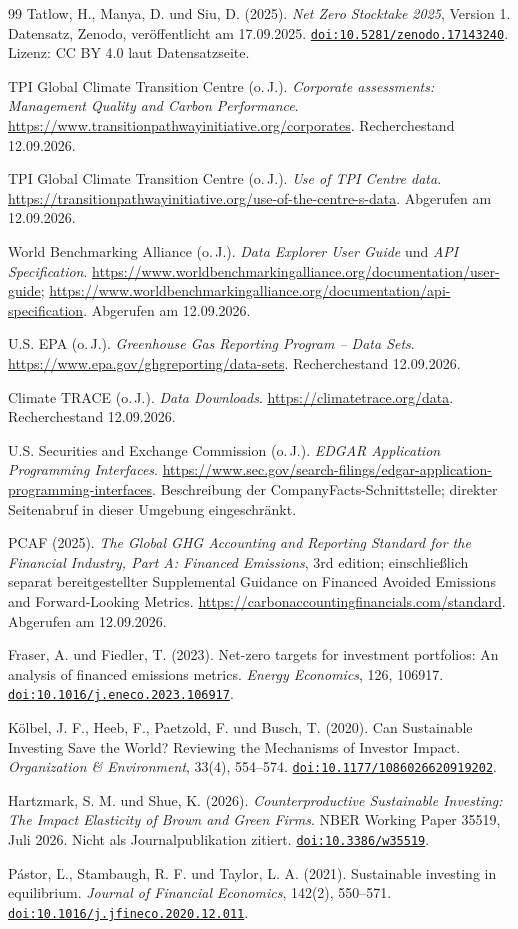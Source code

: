 \documentclass[11pt,a4paper]{article}
\newcommand{\doi}[1]{\href{https://doi.org/#1}{\nolinkurl{doi:#1}}}
\begin{document}
\begin{thebibliography}{99}
 Tatlow, H., Manya, D. und Siu, D. (2025). \emph{Net Zero Stocktake 2025}, Version 1. Datensatz, Zenodo, veröffentlicht am 17.09.2025. \doi{10.5281/zenodo.17143240}. Lizenz: CC BY 4.0 laut Datensatzseite.

 TPI Global Climate Transition Centre (o.\,J.). \emph{Corporate assessments: Management Quality and Carbon Performance}. \url{https://www.transitionpathwayinitiative.org/corporates}. Recherchestand 12.09.2026.

 TPI Global Climate Transition Centre (o.\,J.). \emph{Use of TPI Centre data}. \url{https://transitionpathwayinitiative.org/use-of-the-centre-s-data}. Abgerufen am 12.09.2026.

 World Benchmarking Alliance (o.\,J.). \emph{Data Explorer User Guide} und \emph{API Specification}. \url{https://www.worldbenchmarkingalliance.org/documentation/user-guide}; \url{https://www.worldbenchmarkingalliance.org/documentation/api-specification}. Abgerufen am 12.09.2026.

 U.S. EPA (o.\,J.). \emph{Greenhouse Gas Reporting Program -- Data Sets}. \url{https://www.epa.gov/ghgreporting/data-sets}. Recherchestand 12.09.2026.

 Climate TRACE (o.\,J.). \emph{Data Downloads}. \url{https://climatetrace.org/data}. Recherchestand 12.09.2026.

 U.S. Securities and Exchange Commission (o.\,J.). \emph{EDGAR Application Programming Interfaces}. \url{https://www.sec.gov/search-filings/edgar-application-programming-interfaces}. Beschreibung der CompanyFacts-Schnittstelle; direkter Seitenabruf in dieser Umgebung eingeschränkt.

 PCAF (2025). \emph{The Global GHG Accounting and Reporting Standard for the Financial Industry, Part A: Financed Emissions}, 3rd edition; einschließlich separat bereitgestellter Supplemental Guidance on Financed Avoided Emissions and Forward-Looking Metrics. \url{https://carbonaccountingfinancials.com/standard}. Abgerufen am 12.09.2026.

 Fraser, A. und Fiedler, T. (2023). Net-zero targets for investment portfolios: An analysis of financed emissions metrics. \emph{Energy Economics}, 126, 106917. \doi{10.1016/j.eneco.2023.106917}.

 Kölbel, J. F., Heeb, F., Paetzold, F. und Busch, T. (2020). Can Sustainable Investing Save the World? Reviewing the Mechanisms of Investor Impact. \emph{Organization \& Environment}, 33(4), 554--574. \doi{10.1177/1086026620919202}.

 Hartzmark, S. M. und Shue, K. (2026). \emph{Counterproductive Sustainable Investing: The Impact Elasticity of Brown and Green Firms}. NBER Working Paper 35519, Juli 2026. Nicht als Journalpublikation zitiert. \doi{10.3386/w35519}.

 Pástor, Ľ., Stambaugh, R. F. und Taylor, L. A. (2021). Sustainable investing in equilibrium. \emph{Journal of Financial Economics}, 142(2), 550--571. \doi{10.1016/j.jfineco.2020.12.011}.
\end{thebibliography}
\end{document}
